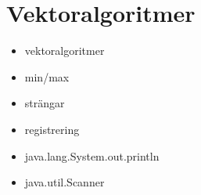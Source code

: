 \chapter{Vektoralgoritmer}\label{chapter:W05}
\begin{itemize}[nosep]
\item vektoralgoritmer
\item min/max
\item strängar
\item registrering
\item java.lang.System.out.println
\item java.util.Scanner
\end{itemize}